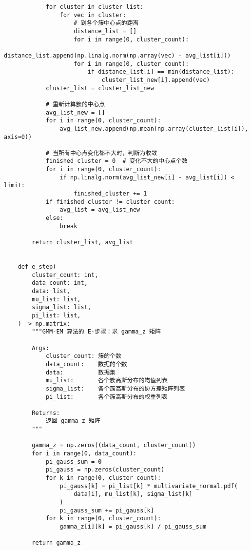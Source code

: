 \begin{verbatim}
            for cluster in cluster_list:
                for vec in cluster:
                    # 到各个簇中心点的距离
                    distance_list = []
                    for i in range(0, cluster_count):
                        distance_list.append(np.linalg.norm(np.array(vec) - avg_list[i]))
                    for i in range(0, cluster_count):
                        if distance_list[i] == min(distance_list):
                            cluster_list_new[i].append(vec)
            cluster_list = cluster_list_new

            # 重新计算簇的中心点
            avg_list_new = []
            for i in range(0, cluster_count):
                avg_list_new.append(np.mean(np.array(cluster_list[i]), axis=0))

            # 当所有中心点变化都不大时，判断为收敛
            finished_cluster = 0  # 变化不大的中心点个数
            for i in range(0, cluster_count):
                if np.linalg.norm(avg_list_new[i] - avg_list[i]) < limit:
                    finished_cluster += 1
            if finished_cluster != cluster_count:
                avg_list = avg_list_new
            else:
                break

        return cluster_list, avg_list


    def e_step(
        cluster_count: int,
        data_count: int,
        data: list,
        mu_list: list,
        sigma_list: list,
        pi_list: list,
    ) -> np.matrix:
        """GMM-EM 算法的 E-步骤：求 gamma_z 矩阵

        Args:
            cluster_count: 簇的个数
            data_count:    数据的个数
            data:          数据集
            mu_list:       各个簇高斯分布的均值列表
            sigma_list:    各个簇高斯分布的协方差矩阵列表
            pi_list:       各个簇高斯分布的权重列表

        Returns:
            返回 gamma_z 矩阵
        """

        gamma_z = np.zeros((data_count, cluster_count))
        for i in range(0, data_count):
            pi_gauss_sum = 0
            pi_gauss = np.zeros(cluster_count)
            for k in range(0, cluster_count):
                pi_gauss[k] = pi_list[k] * multivariate_normal.pdf(
                    data[i], mu_list[k], sigma_list[k]
                )
                pi_gauss_sum += pi_gauss[k]
            for k in range(0, cluster_count):
                gamma_z[i][k] = pi_gauss[k] / pi_gauss_sum

        return gamma_z



\end{verbatim}
